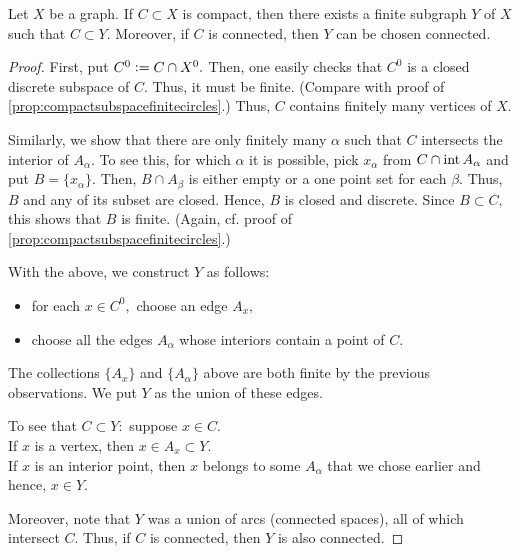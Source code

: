 \documentclass[12pt]{article}
\begin{document}
\begin{prop} \label{prop:compactsubspacefinitegraph}
	Let $X$ be a graph. If $C \subset X$ is compact, then there exists a finite subgraph $Y$ of $X$ such that $C \subset Y.$ Moreover, if $C$ is connected, then $Y$ can be chosen connected.
\end{prop}
\begin{proof} 
	First, put $C^0 \vcentcolon= C \cap X^0.$ Then, one easily checks that $C^0$ is a closed discrete subspace of $C.$ Thus, it must be finite. (Compare with proof of \cref{prop:compactsubspacefinitecircles}.) Thus, $C$ contains finitely many vertices of $X.$

	Similarly, we show that there are only finitely many $\alpha$ such that $C$ intersects the interior of $A_\alpha.$ To see this, for which $\alpha$ it is possible, pick $x_\alpha$ from $C \cap \operatorname{int} A_\alpha$ and put $B = \{x_\alpha\}.$ Then, $B \cap A_\beta$ is either empty or a one point set for each $\beta.$ Thus, $B$ and any of its subset are closed. Hence, $B$ is closed and discrete. Since $B \subset C,$ this shows that $B$ is finite. (Again, cf. proof of \cref{prop:compactsubspacefinitecircles}.)

	With the above, we construct $Y$ as follows: 
	\begin{itemize}
		\item for each $x \in C^0,$ choose an edge $A_x,$
		\item choose all the edges $A_\alpha$ whose interiors contain a point of $C.$
	\end{itemize}
	The collections $\{A_x\}$ and $\{A_\alpha\}$ above are both finite by the previous observations. We put $Y$ as the union of these edges.

	To see that $C \subset Y:$ suppose $x \in C.$ \\
	If $x$ is a vertex, then $x \in A_x \subset Y.$ \\
	If $x$ is an interior point, then $x$ belongs to some $A_\alpha$ that we chose earlier and hence, $x \in Y.$

	Moreover, note that $Y$ was a union of arcs (connected spaces), all of which intersect $C.$ Thus, if $C$ is connected, then $Y$ is also connected.
\end{proof}
\end{document}
